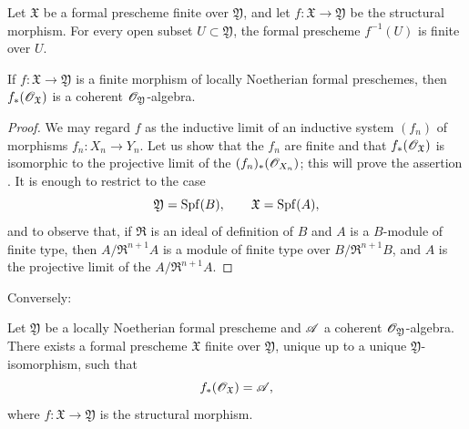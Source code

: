 \begin{corollary}[4.8.5]
\label{III.4.8.5}
Let $\mathfrak{X}$ be a formal prescheme finite over
$\mathfrak{Y}$, and let
$f:\mathfrak{X}\to\mathfrak{Y}$ be the structural morphism.  For
every open subset $U\subset\mathfrak{Y}$, the formal prescheme
$f^{-1}(U)$ is finite over $U$.
\end{corollary}

\begin{proposition}[4.8.6]
\label{III.4.8.6}
If $f:\mathfrak{X}\to\mathfrak{Y}$ is a finite morphism of locally
Noetherian formal preschemes, then
$f_*(\mathscr{O}_{\mathfrak{X}})$ is a coherent
$\mathscr{O}_{\mathfrak{Y}}$-algebra.
\end{proposition}

\begin{proof}
We may regard $f$ as the inductive limit of an inductive system
$(f_n)$ of morphisms $f_n:X_n\to Y_n$.  Let us show that the
$f_n$ are finite and that $f_*(\mathscr{O}_{\mathfrak{X}})$ is
isomorphic to the projective limit of the
$(f_n)_*(\mathscr{O}_{X_n})$; this will prove the assertion
.  It is enough to restrict to the case
\[
  \mathfrak{Y}=\operatorname{Spf}(B),\qquad \mathfrak{X}=\operatorname{Spf}(A),
\]
and to observe that, if $\mathfrak{R}$ is an ideal of definition
of $B$ and $A$ is a $B$-module of finite type, then
$A/\mathfrak{R}^{n+1}A$ is a module of finite type over
$B/\mathfrak{R}^{n+1}B$, and $A$ is the projective limit of the
$A/\mathfrak{R}^{n+1}A$.
\end{proof}

Conversely:

\begin{proposition}[4.8.7]
\label{III.4.8.7}
Let $\mathfrak{Y}$ be a locally Noetherian formal prescheme and
$\mathscr{A}$ a coherent $\mathscr{O}_{\mathfrak{Y}}$-algebra.  There exists
a formal prescheme $\mathfrak{X}$ finite over $\mathfrak{Y}$,
unique up to a unique $\mathfrak{Y}$-isomorphism, such that
\[
  f_*(\mathscr{O}_{\mathfrak{X}})=\mathscr{A},
\]
where $f:\mathfrak{X}\to\mathfrak{Y}$ is the structural morphism.
\end{proposition}

